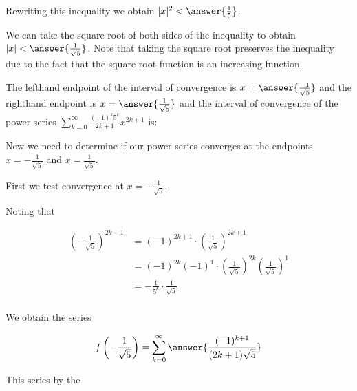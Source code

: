 \documentclass{ximera}
\begin{document}
\begin{exercise}
\begin{exercise}
\begin{hint}
Rewriting this inequality we obtain $|x|^2< \answer{\frac{1}{5}}$. 

We can take the square root of both sides of the inequality to obtain $|x|<\answer{\frac{1}{\sqrt{5}}}$. Note that taking the square root preserves the inequality due to the fact that the square root function is an increasing function.

\end{hint}

\begin{exercise}

The lefthand endpoint of the interval of convergence is $x=\answer{\frac{-1}{\sqrt{5}}}$ and the righthand endpoint is $x= \answer{\frac{1}{\sqrt{5}}}$ and the interval of convergence of the power series $\sum_{k=0}^{\infty} \frac{(-1)^k 5^k }{2k+1}x^{2k+1}$ is:
\begin{multipleChoice}
\choice{$\left(-\frac{1}{\sqrt{5}},\frac{1}{\sqrt{5}}\right]$}
\choice{$\left[-\frac{1}{\sqrt{5}},\frac{1}{\sqrt{5}}\right)$}
\end{multipleChoice}


\begin{hint}

 Now we need to determine if our power series converges at the endpoints $x=-\frac{1}{\sqrt{5}}$ and $x=\frac{1}{\sqrt{5}}$. 

First we test convergence at $x=-\frac{1}{\sqrt{5}}$. 

Noting that 

\begin{align*} 
\left( - \frac{1}{\sqrt{5}} \right)^{2k+1} &=  \left( - 1 \right)^{2k+1} \cdot \left(\frac{1}{\sqrt{5}} \right)^{2k+1}  \\
&=\left( - 1 \right)^{2k}(-1)^1 \cdot \left(\frac{1}{\sqrt{5}} \right)^{2k}\left(\frac{1}{\sqrt{5}} \right)^1 \\
&= -\frac{1}{5^k} \cdot \frac{1}{\sqrt{5}} \\
\end{align*}


 We obtain the series

\[
f\left(-\frac{1}{\sqrt{5}}\right) = \sum^{\infty}_{k=0} \answer{\frac{(-1)^{k+1}}{(2k+1)\sqrt{5}}}
\]


This series  by the 

\begin{multipleChoice}
\end{multipleChoice}



\end{hint}
\end{exercise}
\end{exercise}
\end{exercise}
\end{document}
